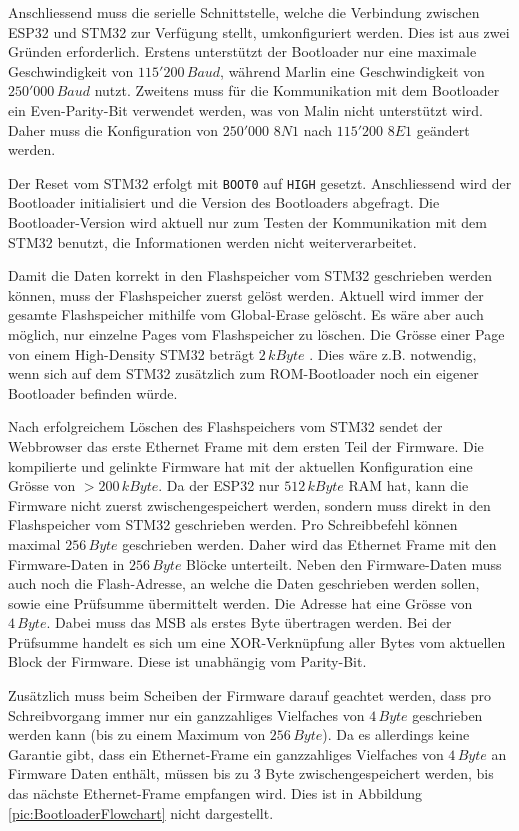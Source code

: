 Anschliessend muss die serielle Schnittstelle, welche die Verbindung zwischen ESP32 und STM32 zur Verfügung stellt, umkonfiguriert werden. Dies ist aus zwei Gründen erforderlich. Erstens unterstützt der Bootloader nur eine maximale Geschwindigkeit von $115'200\,\si{Baud}$, während Marlin eine Geschwindigkeit von $250'000\,\si{Baud}$ nutzt. Zweitens muss für die Kommunikation mit dem Bootloader ein Even-Parity-Bit verwendet werden, was von Malin nicht unterstützt wird. Daher muss die Konfiguration von $250'000$ $8N1$ nach $115'200$ $8E1$ geändert werden.

Der Reset vom STM32 erfolgt mit \texttt{BOOT0} auf \texttt{HIGH} gesetzt. Anschliessend wird der Bootloader initialisiert und die Version des Bootloaders abgefragt. Die Bootloader-Version wird aktuell nur zum Testen der Kommunikation mit dem STM32 benutzt, die Informationen werden nicht weiterverarbeitet.

Damit die Daten korrekt in den Flashspeicher vom STM32 geschrieben werden können, muss der Flashspeicher zuerst gelöst werden. Aktuell wird immer der gesamte Flashspeicher mithilfe vom Global-Erase gelöscht. Es wäre aber auch möglich, nur einzelne Pages vom Flashspeicher zu löschen. Die Grösse einer Page von einem High-Density STM32 beträgt $2\,\si{kByte}$ \cite{RM0008}. Dies wäre z.B. notwendig, wenn sich auf dem STM32 zusätzlich zum ROM-Bootloader noch ein eigener Bootloader befinden würde.

Nach erfolgreichem Löschen des Flashspeichers vom STM32 sendet der Webbrowser das erste Ethernet Frame mit dem ersten Teil der Firmware. Die kompilierte und gelinkte Firmware hat mit der aktuellen Konfiguration eine Grösse von $>200\,\si{kByte}$. Da der ESP32 nur $512\,\si{kByte}$ RAM hat, kann die Firmware nicht zuerst zwischengespeichert werden, sondern muss direkt in den Flashspeicher vom STM32 geschrieben werden. Pro Schreibbefehl können maximal $256\,\si{Byte}$ geschrieben werden. Daher wird das Ethernet Frame mit den Firmware-Daten in $256\,\si{Byte}$ Blöcke unterteilt. Neben den Firmware-Daten muss auch noch die Flash-Adresse, an welche die Daten geschrieben werden sollen, sowie eine Prüfsumme übermittelt werden. Die Adresse hat eine Grösse von $4\,\si{Byte}$. Dabei muss das MSB als erstes Byte übertragen werden. Bei der Prüfsumme handelt es sich um eine XOR-Verknüpfung aller Bytes vom aktuellen Block der Firmware. Diese ist unabhängig vom Parity-Bit.

Zusätzlich muss beim Scheiben der Firmware darauf geachtet werden, dass pro Schreibvorgang immer nur ein ganzzahliges Vielfaches von $4\,\si{Byte}$ geschrieben werden kann (bis zu einem Maximum von $256\,\si{Byte}$). Da es allerdings keine Garantie gibt, dass ein Ethernet-Frame ein ganzzahliges Vielfaches von $4\,\si{Byte}$ an Firmware Daten enthält, müssen bis zu 3 Byte zwischengespeichert werden, bis das nächste Ethernet-Frame empfangen wird. Dies ist in Abbildung \ref{pic:BootloaderFlowchart} nicht dargestellt.


